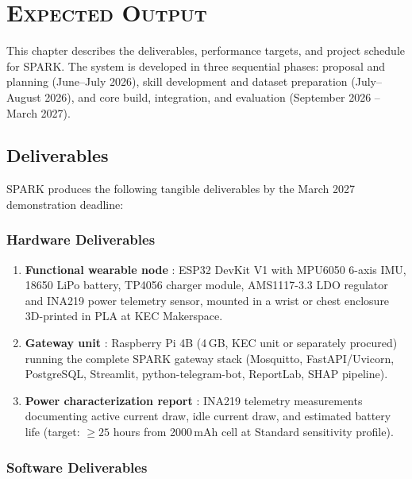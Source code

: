 
\chapter{\scshape Expected Output}
\label{chap:expected_output}

This chapter describes the deliverables, performance targets, and project schedule for SPARK. The system is developed in three sequential phases: proposal and planning (June--July 2026), skill development and dataset preparation (July--August 2026), and core build, integration, and evaluation (September 2026 -- March 2027).

\section{Deliverables}

SPARK produces the following tangible deliverables by the March 2027 demonstration deadline:

\subsection{Hardware Deliverables}

\begin{enumerate}
    \item \textbf{Functional wearable node} : ESP32 DevKit V1 with MPU6050 6-axis IMU, 18650 LiPo battery, TP4056 charger module, AMS1117-3.3 LDO regulator and INA219 power telemetry sensor, mounted in a wrist or chest enclosure 3D-printed in PLA at KEC Makerspace.

    \item \textbf{Gateway unit} : Raspberry Pi 4B (4\,GB, KEC unit or separately procured) running the complete SPARK gateway stack (Mosquitto, FastAPI/Uvicorn, PostgreSQL, Streamlit, python-telegram-bot, ReportLab, SHAP pipeline).

    \item \textbf{Power characterization report} : INA219 telemetry measurements documenting active current draw, idle current draw, and estimated battery life (target: $\geq 25$ hours from 2000\,mAh cell at Standard sensitivity profile).
\end{enumerate}

\subsection{Software Deliverables}

